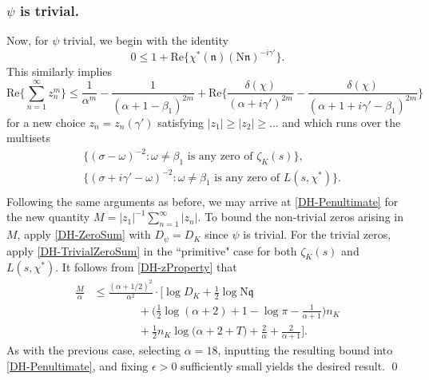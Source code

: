 \documentclass[12pt,psamsfonts]{amsart}
\theoremstyle{definition}
\theoremstyle{remark}
\numberwithin{equation}{section}
\theoremstyle{plain}
\theoremstyle{remark}
\renewcommand{\1}{ {\bf 1}}
\newcommand{\kn}{\mathfrak{n}}
\newcommand{\N}{\mathrm{N}}
\newcommand{\kq}{\mathfrak{q}}
\renewcommand{\Re}{\mathrm{Re}}
\begin{document}
\subsubsection{$\psi$ is trivial.}
Now, for $\psi$ trivial, we begin with the identity
\[
0 \leq 1 + \Re\{\chi^*(\kn) (\N\kn)^{-i\gamma'} \}.
\]
This similarly implies
\begin{equation}
\Re\Big\{ \sum_{n=1}^{\infty}  z_n^m \Big\} \leq \frac{1}{\alpha^m} - \frac{1}{(\alpha+1-\beta_1)^{2m}} + \Re\Big\{ \frac{\delta(\chi)}{(\alpha+i\gamma')^{2m}} - \frac{\delta(\chi)}{(\alpha +1+i\gamma' -\beta_1)^{2m}} \Big\} 
\label{DH-AllZeros_PowerSumPrep}
\end{equation}
for a new choice $z_n = z_n(\gamma')$ satisfying $|z_1| \geq |z_2| \geq \dots$ and which runs over the multisets
\begin{equation}
\begin{aligned}
& \{  (\sigma-\omega)^{-2} :  \omega \neq \beta_1 \text{ is any zero of $\zeta_K(s)$} \}, \\
& \{  (\sigma+i\gamma'-\omega)^{-2}  :  \omega \neq \beta_1 \text{ is any zero of $L(s, \chi^*)$} \}. \\
\end{aligned}
\label{DH-AllZeros_z_n_Principal}
\end{equation}
Following the same arguments as before, we may arrive at \eqref{DH-Penultimate} for the new quantity $M = |z_1|^{-1} \sum_{n=1}^{\infty} |z_n|$. To bound the non-trivial zeros arising in $M$, apply \cref{DH-ZeroSum} with $D_{\psi} = D_K$ since $\psi$ is trivial.  For the trivial zeros, apply \cref{DH-TrivialZeroSum}  in the ``primitive" case for both $\zeta_K(s)$ and $L(s,\chi^*)$. It follows from \eqref{DH-zProperty} that
\begin{equation}
\label{DH-M_Principal}
\begin{aligned}
\frac{M}{\alpha}  & \leq \frac{(\alpha+1/2)^{2}}{\alpha^2}   \cdot \Big[ \log D_K + \frac{1}{2} \log \N\kq \\
& \qquad\qquad +\Big( \frac{1}{2} \log(\alpha+2)  + 1 - \log \pi - \frac{1}{\alpha+1}   \Big) n_K \\
& \qquad\qquad+  \frac{1}{2} n_K \log\Big(\alpha+2+T\Big)+ \frac{2}{\alpha} + \frac{2}{\alpha+1} \Big]. 
\end{aligned}
\end{equation}
As with the previous case, selecting $\alpha = 18$, inputting the resulting bound into \eqref{DH-Penultimate}, and fixing $\epsilon > 0$ sufficiently small yields the desired result. \hfill \qed



\end{document}
